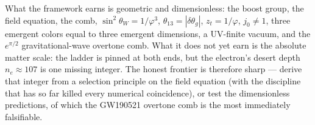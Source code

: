 \documentclass[11pt,onecolumn]{article}
\theoremstyle{plain}
\theoremstyle{definition}
\theoremstyle{remark}
\newcommand{\phigr}{\varphi}                         %
\begin{document}
What the framework earns is geometric and dimensionless: the boost group, the
field equation, the comb, $\sin^2\theta_W=1/\phigr^3$, $\theta_{13}=|\delta\theta_g|$,
$z_t=1/\phigr$, $j_0\neq1$, three emergent colors equal to three emergent
dimensions, a UV-finite vacuum, and the $e^{\pi/2}$ gravitational-wave overtone
comb. What it does not yet earn is the absolute matter scale: the ladder is pinned
at both ends, but the electron's desert depth $n_e\approx107$ is one missing
integer. The honest frontier is therefore sharp --- derive that integer from a
selection principle on the field equation (with the discipline that has so far
killed every numerical coincidence), or test the dimensionless predictions, of
which the GW190521 overtone comb is the most immediately falsifiable.

\appendix

\end{document}
